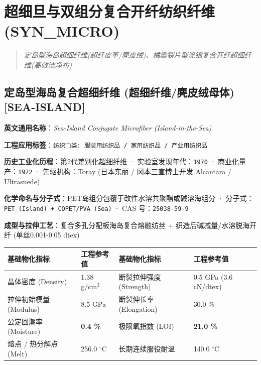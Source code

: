 \documentclass[11pt,openright,twoside,UTF8]{ctexbook}
\begin{document}
\chapter{超细旦与双组分复合开纤纺织纤维 (SYN\_MICRO)}
\begin{quote}
\small\itshape
定岛型海岛超细纤维(超纤皮革/麂皮绒)、橘瓣裂片型涤锦复合开纤超细纤维(高效洁净布)
\end{quote}

\section{定岛型海岛复合超细纤维 (超细纤维/麂皮绒母体) [SEA-ISLAND]}
\label{sec:sea-island}

\noindent\textbf{英文通用名称}：\textit{Sea-Island Conjugate Microfiber (Island-in-the-Sea)}\par
\noindent\textbf{工程应用标签}：\texttt{纺织门类: 服装用纺织品 / 家用纺织品 / 产业用纺织品}\par
\noindent\textbf{历史工业化历程}：第2代差别化超细纤维 · 实验室发现年代：\texttt{1970} · 商业化量产：\texttt{1972} · 先驱机构：Toray (日本东丽 / 冈本三宣博士开发 Alcantara / Ultrasuede)\par
\noindent\textbf{化学命名与分子式}：PET岛组分包覆于改性水溶共聚酯或碱溶海组分 · 分子式：\texttt{PET (Island) + COPET/PVA (Sea)} · CAS 号：\texttt{25038-59-9}\par
\noindent\textbf{成型与拉伸工艺}：复合多孔分配板海岛复合熔融纺丝 + 织造后碱减量/水溶脱海开纤 (单丝0.001-0.05 dtex)\par

\vspace{0.15cm}
\begin{center}
\small
\begin{tabularx}{\textwidth}{p{3.8cm}Xp{3.8cm}X}
\toprule
\textbf{基础物化指标} & \textbf{工程参考值} & \textbf{基础物化指标} & \textbf{工程参考值} \\
\midrule
晶体密度 (Density) & 1.38 g/cm$^3$ & 断裂拉伸强度 (Strength) & 0.5 GPa (3.6 cN/dtex) \\
拉伸初始模量 (Modulus) & 8.5 GPa & 断裂伸长率 (Elongation) & 30.0 \% \\
公定回潮率 (Moisture) & \textbf{0.4 \%} & 极限氧指数 (LOI) & \textbf{21.0 \%} \\
熔点 / 热分解点 (Melt) & 256.0 $^\circ\mathrm{C}$ & 长期连续服役耐温 & 140.0 $^\circ\mathrm{C}$ \\
\bottomrule
\end{tabularx}
\end{center}
\vspace{0.15cm}
\end{document}
